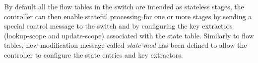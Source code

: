 By default all the flow tables in the switch are intended as stateless stages, the controller can then enable stateful processing for one or more stages by sending a special control message to the switch and by configuring the key extractors (lookup-scope and update-scope) associated with the state table. Similarly to flow tables, new modification message called \emph{state-mod} has been defined to allow the controller to configure the state entries and key extractors.





